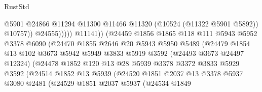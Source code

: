 \begin{lexlean}{RustStd}
\begin{coremodule}
                                          @5901
                                          @24866
                                          @11294
                                          @11300
                                          @11466
                                          @11320
                                          (@10524 (@11322 @5901 @5892))
                                          @10757))
                                      @24555)))))
                            @11141))
                        (@24459
                          @1856
                          @1865
                          @118
                          @111
                          @5943
                          @5952
                          @3378
                          @6090
                          (@24470
                            @1855
                            @2646
                            @20
                            @5943
                            @5950
                            @5489
                            (@24479
                              @1854
                              @13
                              @102
                              @3673
                              @5942
                              @5949
                              @3833
                              @5919
                              @3592
                              (@24493 @3673 @24497 @12324)
                              (@24478
                                @1852
                                @120
                                @13
                                @28
                                @5939
                                @3378
                                @3372
                                @3833
                                @5929
                                @3592
                                (@24514
                                  @1852
                                  @13
                                  @5939
                                  (@24520
                                    @1851
                                    @2037
                                    @13
                                    @3378
                                    @5937
                                    @3080
                                    @2481
                                    (@24529
                                      @1851
                                      @2037
                                      @5937
                                      (@24534
                                        @1849

\end{coremodule}
\end{lexlean}
